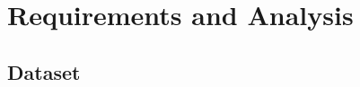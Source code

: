 \documentclass[Dissertation.tex]{subfiles}
\begin{document}
\chapter{Requirements and Analysis}
\section{Dataset} \label{Data}
\end{document}

